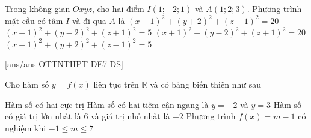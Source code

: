 \begin{ex}%
	Trong không gian $Oxyz$, cho hai điểm $I(1;-2;1)$ và $A(1;2;3)$. Phương trình mặt cầu có tâm $I$ và đi qua $A$ là
	\choice
	{\True $(x-1)^2+(y+2)^2+(z-1)^2=20$}
	{$(x+1)^2+(y-2)^2+(z+1)^2=5$}
	{$(x+1)^2+(y-2)^2+(z+1)^2=20$}
	{$(x-1)^2+(y+2)^2+(z-1)^2=5$}
\end{ex}
\cauds
{}[ans/ans-OTTNTHPT-DE7-DS]
\begin{ex}%
	Cho hàm số $y=f(x)$ liên tục trên $\mathbb{R}$ và có bảng biến thiên như sau
	\begin{center}
	\end{center}
	\choiceTF
	{\True Hàm số có hai cực trị}
	{Hàm số có hai tiệm cận ngang là $y=-2$ và $y=3$}
	{Hàm số có giá trị lớn nhất là $6$ và giá trị nhỏ nhất là $-2$}
	{Phương trình $f(x)=m-1$ có nghiệm khi $-1 \leq m \leq 7$}	
\end{ex}
